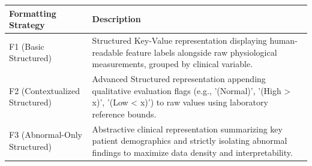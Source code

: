 \begin{tabular}{l p{12cm}}
\toprule
Formatting Strategy & Description \\
\midrule
F1 (Basic Structured) & Structured Key-Value representation displaying human-readable feature labels alongside raw physiological measurements, grouped by clinical variable. \\
F2 (Contextualized Structured) & Advanced Structured representation appending qualitative evaluation flags (e.g., '(Normal)', '(High > x)', '(Low < x)') to raw values using laboratory reference bounds. \\
F3 (Abnormal-Only Structured) & Abstractive clinical representation summarizing key patient demographics and strictly isolating abnormal findings to maximize data density and interpretability. \\
\bottomrule
\end{tabular}
